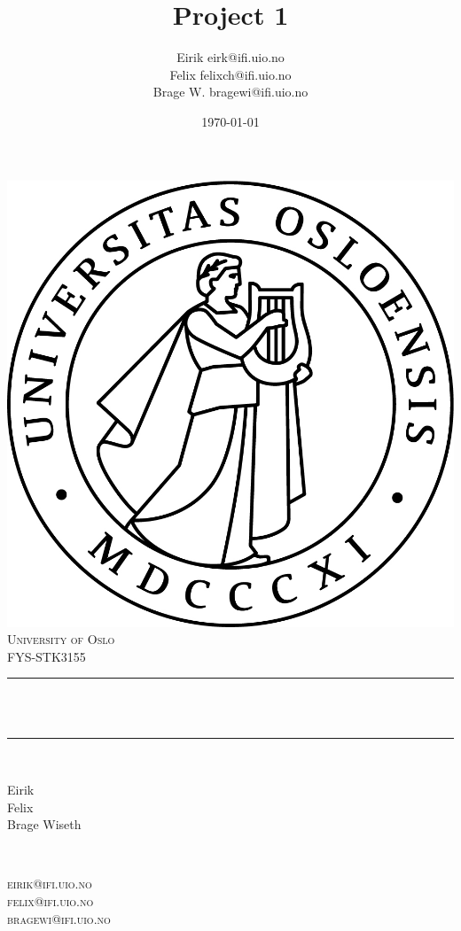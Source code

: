 \documentclass[twoside,11pt]{report}
\title{{\huge Project 1}}
\author{\name Eirik \email eirk@ifi.uio.no \\
       \name Felix  \email felixch@ifi.uio.no \\
       \name Brage W. \email bragewi@ifi.uio.no}
\date{\today}											%
\begin{document}

\begin{titlepage}
	\centering
    \vspace*{0.5 cm}
    \includegraphics[scale = 0.75]{uio.jpg}\\[1.0 cm]	%
    \textsc{\LARGE University of Oslo}\\[2.0 cm]	%
	\textsc{\Large FYS-STK3155}\\[0.5 cm]				%
	\rule{\linewidth}{0.2 mm} \\[0.4 cm]
	{ \huge \bfseries \@title}\\
	\rule{\linewidth}{0.2 mm} \\[1.5 cm]

	\begin{minipage}{0.4\textwidth}
		\begin{flushleft} \normalsize
			Eirik\\
            Felix\\
            Brage Wiseth\\
			\end{flushleft}
			\end{minipage}~
			\begin{minipage}{0.4\textwidth}
			\begin{flushright} \normalsize
        \textsc{
		  eirik@ifi.uio.no\\
          felix@ifi.uio.no\\
          bragewi@ifi.uio.no\\
        }
		\end{flushright}
        

\end{minipage}
\end{titlepage}
\end{document}
